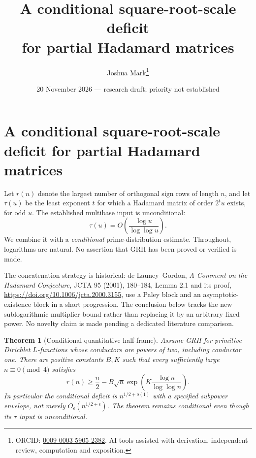 \documentclass[11pt]{article}
\title{A conditional square-root-scale deficit\\for partial Hadamard matrices}
\author{Joshua Mark\thanks{ORCID: \href{https://orcid.org/0009-0003-5905-2382}{0009-0003-5905-2382}. AI tools assisted with derivation, independent review, computation and exposition.}}
\date{20 November 2026 --- research draft; priority not established}
\newtheorem{theorem}{Theorem}[section]
\begin{document}
\maketitle
\section{A conditional square-root-scale deficit for partial Hadamard matrices}
\label{sec:conditional-half-frame}

Let $r(n)$ denote the largest number of orthogonal sign rows of length
$n$, and let $\tau(u)$ be the least exponent $t$ for which a Hadamard
matrix of order $2^tu$ exists, for odd $u$. The established multibase
input is unconditional:
\[
 \tau(u)=O\!\left(\frac{\log u}{\log\log u}\right).
\]
We combine it with a \emph{conditional} prime-distribution estimate.
Throughout, logarithms are natural. No assertion that GRH has been
proved or verified is made.

The concatenation strategy is historical: de Launey--Gordon,
\emph{A Comment on the Hadamard Conjecture}, JCTA 95 (2001),
180--184, Lemma 2.1 and its proof,
\url{https://doi.org/10.1006/jcta.2000.3155}, use a Paley block and
an asymptotic-existence block in a short progression. The conclusion
below tracks the new sublogarithmic multiplier bound rather than
replacing it by an arbitrary fixed power. No novelty claim is made
pending a dedicated literature comparison.

\begin{theorem}[Conditional quantitative half-frame]
Assume GRH for primitive Dirichlet $L$-functions whose conductors are
powers of two, including conductor one. There are positive constants
$B,K$ such that every sufficiently large $n\equiv0\pmod4$ satisfies
\[
 \boxed{r(n)\ge\frac n2-
 B\sqrt n\exp\!\left(K\frac{\log n}{\log\log n}\right).}
\]
In particular the conditional deficit is $n^{1/2+o(1)}$ with a
specified subpower envelope, not merely $O_\epsilon(n^{1/2+\epsilon})$.
The theorem remains conditional even though its $\tau$ input is
unconditional.
\end{theorem}
\end{document}
